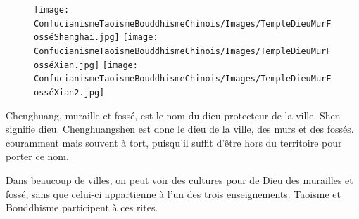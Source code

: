\begin{Ex}

    \begin{figure}[!h]
        \centering
                \texttt{[image: ConfucianismeTaoismeBouddhismeChinois/Images/TempleDieuMurFosséShanghai.jpg]}
    \texttt{[image: ConfucianismeTaoismeBouddhismeChinois/Images/TempleDieuMurFosséXian.jpg]}
        \texttt{[image: ConfucianismeTaoismeBouddhismeChinois/Images/TempleDieuMurFosséXian2.jpg]}

        

        \label{fig:enter-label}
    \end{figure}
    Chenghuang, muraille et fossé, est le nom du dieu protecteur de la ville. Shen signifie dieu. Chenghuangshen est donc le dieu de la ville, des murs et des fossés. couramment mais souvent à tort, puisqu'il suffit d'être hors du territoire pour porter ce nom.

    Dans beaucoup de villes, on peut voir des cultures pour de Dieu des murailles et fossé, sans que celui-ci appartienne à l'un des trois enseignements. Taoisme et Bouddhisme participent à ces rites.
\end{Ex}

